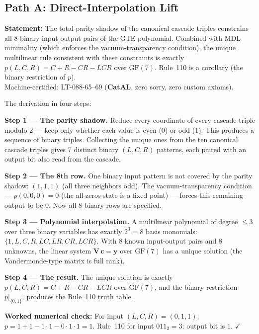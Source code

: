 \documentclass[11pt,a4paper]{article}
\newcommand{\CatAL}{\textbf{CatAL}}
\begin{document}
\subsection{Path A: Direct-Interpolation Lift}

\begin{tcolorbox}[colback=boxteal,colframe=blue!40!black,
  title={Direct-Interpolation Lift Theorem (\CatAL)}]
\textbf{Statement:} The total-parity shadow of the canonical cascade triples
constrains all 8 binary input-output pairs of the GTE polynomial.
Combined with MDL minimality (which enforces the vacuum-transparency condition),
the unique multilinear rule consistent with these constraints is exactly
$p(L,C,R) = C + R - CR - LCR$ over $\mathrm{GF}(7)$.  Rule~110 is a corollary
(the binary restriction of $p$).\\[4pt]
Machine-certified: LT-088-65--69 (\CatAL, zero sorry, zero custom axioms).
\end{tcolorbox}

The derivation in four steps:

\textbf{Step 1 — The parity shadow.}  Reduce every coordinate of every cascade
triple modulo 2 — keep only whether each value is even (0) or odd (1).
This produces a sequence of binary triples.  Collecting the unique ones from the
ten canonical cascade triples gives 7 distinct binary $(L,C,R)$ patterns,
each paired with an output bit also read from the cascade.

\textbf{Step 2 — The 8th row.}  One binary input pattern is not covered by the
parity shadow: $(1,1,1)$ (all three neighbors odd).  The vacuum-transparency
condition — $p(0,0,0) = 0$ (the all-zeros state is a fixed point) — forces this
remaining output to be 0.  Now all 8 binary rows are specified.

\textbf{Step 3 — Polynomial interpolation.}  A multilinear polynomial of
degree $\leq 3$ over three binary variables has exactly $2^3 = 8$ basis
monomials: $\{1, L, C, R, LC, LR, CR, LCR\}$.  With 8 known input-output
pairs and 8 unknowns, the linear system
$\mathbf{V}\,\mathbf{c} = \mathbf{y}$ over $\mathrm{GF}(7)$ has a unique
solution (the Vandermonde-type matrix is full rank).

\textbf{Step 4 — The result.}  The unique solution is exactly
$p(L,C,R) = C + R - CR - LCR$ over $\mathrm{GF}(7)$,
and the binary restriction $p|_{\{0,1\}^3}$ produces the Rule~110 truth table.

\textbf{Worked numerical check:}
For input $(L,C,R) = (0,1,1)$: $p = 1+1-1\cdot1-0\cdot1\cdot1 = 1$.
Rule~110 for input $011_2 = 3$: output bit is $1$. $\checkmark$
\end{document}
